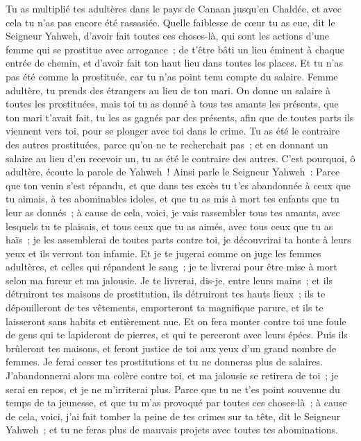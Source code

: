 \begin{multicols}{2}
Tu as multiplié tes adultères dans le pays de Canaan jusqu'en Chaldée, et avec cela tu n'as pas encore été rassasiée.
Quelle faiblesse de cœur tu as eue, dit le Seigneur Yahweh, d'avoir fait toutes ces choses-là, qui sont les actions d'une femme qui se prostitue avec arrogance~;
de t'être bâti un lieu éminent à chaque entrée de chemin, et d'avoir fait ton haut lieu dans toutes les places. Et tu n'as pas été comme la prostituée, car tu n'as point tenu compte du salaire.
Femme adultère, tu prends des étrangers au lieu de ton mari.
On donne un salaire à toutes les prostituées, mais toi tu as donné à tous tes amants les présents, que ton mari t'avait fait, tu les as gagnés par des présents, afin que de toutes parts ils viennent vers toi, pour se plonger avec toi dans le crime.
Tu as été le contraire des autres prostituées, parce qu'on ne te recherchait pas~; et en donnant un salaire au lieu d'en recevoir un, tu as été le contraire des autres.
C'est pourquoi, ô adultère, écoute la parole de Yahweh~!
Ainsi parle le Seigneur Yahweh~: Parce que ton venin s'est répandu, et que dans tes excès tu t'es abandonnée à ceux que tu aimais, à tes abominables idoles, et que tu as mis à mort tes enfants que tu leur as donnés~;
à cause de cela, voici, je vais rassembler tous tes amants, avec lesquels tu te plaisais, et tous ceux que tu as aimés, avec tous ceux que tu as haïs~; je les assemblerai de toutes parts contre toi, je découvrirai ta honte à leurs yeux et ils verront ton infamie.
Et je te jugerai comme on juge les femmes adultères, et celles qui répandent le sang~; je te livrerai pour être mise à mort selon ma fureur et ma jalousie.
Je te livrerai, dis-je, entre leurs mains~; et ils détruiront tes maisons de prostitution, ils détruiront tes hauts lieux~; ils te dépouilleront de tes vêtements, emporteront ta magnifique parure, et ils te laisseront sans habits et entièrement nue.
Et on fera monter contre toi une foule de gens qui te lapideront de pierres, et qui te perceront avec leurs épées.
Puis ils brûleront tes maisons, et feront justice de toi aux yeux d'un grand nombre de femmes. Je ferai cesser tes prostitutions et tu ne donneras plus de salaires.
J'abandonnerai alors ma colère contre toi, et ma jalousie se retirera de toi~; je serai en repos, et je ne m'irriterai plus.
Parce que tu ne t'es point souvenue du temps de ta jeunesse, et que tu m'as provoqué par toutes ces choses-là~; à cause de cela, voici, j'ai fait tomber la peine de tes crimes sur ta tête, dit le Seigneur Yahweh~; et tu ne feras plus de mauvais projets avec toutes tes abominations.

\end{multicols}
